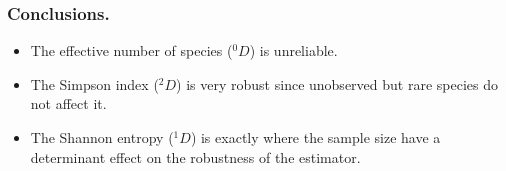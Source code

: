 \documentclass[10pt]{beamer}
\begin{document}
\begin{frame}
\frametitle{Conclusions.}

	\begin{itemize}
	\item<1> The effective number of species ($^0 D$) is unreliable.
	\item<1> The Simpson index ($^2 D$) is very robust since unobserved but rare species do not affect it.
	\item<1> The Shannon entropy ($^1 D$) is exactly where the sample size have a determinant effect on the robustness of the estimator.
	\end{itemize}
	
\end{frame}
\end{document}
